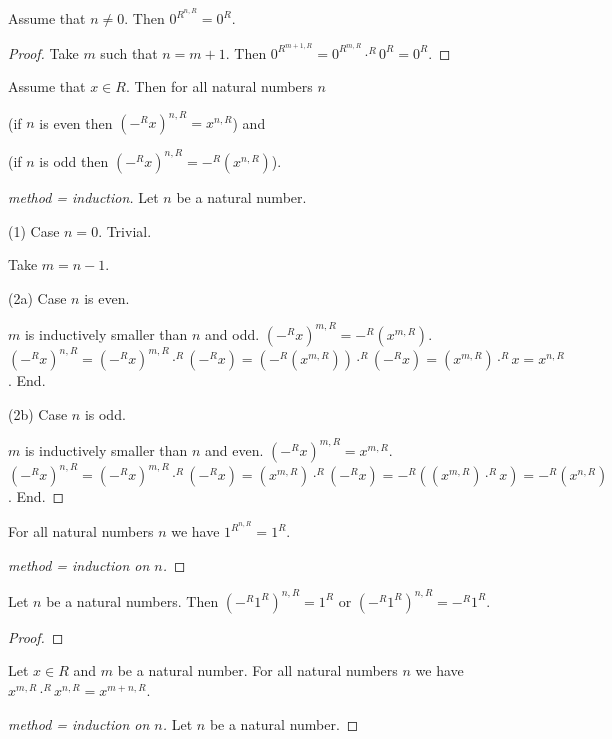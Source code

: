 \documentclass[english,11pt]{article}
\begin{document}
\begin{forthel}
\begin{lemma} Assume that $n \neq 0$. Then $0^{R}^{n,R} = 0^{R}$. \end{lemma}
\begin{proof}
Take $m$ such that
$n = m + 1$. Then $0^{R}^{m+1,R} = 0^{R}^{m,R} \cdot^{R} 0^{R}
= 0^{R}$.
\end{proof}

\begin{lemma}
Assume that $x \in R$. Then for all natural numbers $n$

(if $n$ is even then $(-^{R}x)^{n,R} = x^{n,R}$)
and 

(if $n$ is odd then $(-^{R}x)^{n,R} = -^{R}(x^{n,R})$).
\end{lemma}
\begin{proof}[method = induction]
Let $n$ be a natural number.

(1) Case $n = 0$. Trivial.

Take $m = n - 1$.

(2a) Case $n$ is even. 

$m$ is inductively smaller than $n$ and odd.
$(-^{R}x)^{m,R} = -^{R}(x^{m,R})$.
$(-^{R}x)^{n,R} = (-^{R}x)^{m,R} \cdot^{R} (-^{R}x) = (-^{R}(x^{m,R})) \cdot^{R} (-^{R}x)
= (x^{m,R}) \cdot^{R} x = x^{n,R}$.
End.

(2b) Case $n$ is odd. 

$m$ is inductively smaller than $n$ and even.
$(-^{R}x)^{m,R} = x^{m,R}$.
$(-^{R}x)^{n,R} = (-^{R}x)^{m,R} \cdot^{R} (-^{R}x) = (x^{m,R}) \cdot^{R} (-^{R}x)
= -^{R} ((x^{m,R}) \cdot^{R} x) = -^{R}(x^{n,R})$.
End.

\end{proof}

\begin{lemma} For all natural numbers $n$ we have $1^{R}^{n,R} = 1^{R}$. \end{lemma}
\begin{proof}[method = induction on $n$]
\end{proof}

\begin{lemma} Let $n$ be a natural numbers. Then $(-^{R} 1^{R})^{n,R} = 1^{R}$
or $(-^{R} 1^{R})^{n,R} = -^{R} 1^{R}$. 
\end{lemma}
\begin{proof}
\end{proof}

\begin{lemma} Let $x \in R$ and $m$ be a natural number.
For all natural numbers $n$
we have
$x^{m,R} \cdot^{R} x^{n,R} = x^{m + n,R}$.
\end{lemma}
\begin{proof}[method = induction on $n$]
Let $n$ be a natural number.


\end{proof}
\end{forthel}
\end{document}

